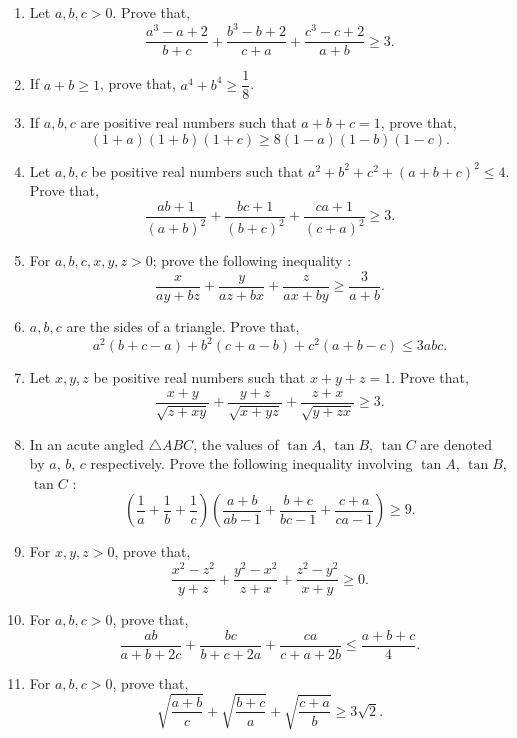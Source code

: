 \documentclass[11pt, a4paper]{article}
\begin{document}
\begin{enumerate}
	\item Let $a, b, c > 0$. Prove that, $$\dfrac{a^3 - a +2}{b+c} + \dfrac{b^3 - b +2}{c + a} + \dfrac{c^3 - c +2}{a + b} \geq 3.$$
	
	\item If $a+b \geq 1$, prove that, $a^4 + b^4 \geq \dfrac{1}{8}$.
	
	\item If $a, b, c$ are positive real numbers such that $a+b+c = 1$, prove that, $$(1+a)(1+b)(1+c) \geq 8 (1-a)(1-b)(1-c).$$
	
	\item Let $a, b, c$ be positive real numbers such that $a^2 + b^2 + c^2 + (a+b+c)^2 \leq 4$. Prove that, $$\dfrac{ab+1}{(a+b)^2} + \dfrac{bc+1}{(b+c)^2} + \dfrac{ca+1}{(c+a)^2} \geq 3.$$
	
	\item For $a, b, c, x, y, z > 0$; prove the following inequality :
	$$\dfrac{x}{ay+bz} + \dfrac{y}{az+bx} + \dfrac{z}{ax+by} \geq \dfrac{3}{a+b}.$$
	
	\item $a, b, c$ are the sides of a triangle. Prove that, $$a^2(b+c-a) + b^2(c+a-b) + c^2(a+b-c) \leq 3abc.$$
	
	\item Let $x, y, z$ be positive real numbers such that $x + y + z = 1$. Prove that, $$\dfrac{x+y}{\sqrt{z+xy}} + \dfrac{y+z}{\sqrt{x+yz}} + \dfrac{z+x}{\sqrt{y+zx}} \geq 3.$$
	
	\item In an acute angled $\bigtriangleup ABC$, the values of $\tan A$, $\tan B$, $\tan C$ are denoted by $a$, $b$, $c$ respectively. Prove the following inequality involving $\tan A$, $\tan B$, $\tan C$ :
	$$\left( \dfrac{1}{a} + \dfrac{1}{b} + \dfrac{1}{c} \right) \left( \dfrac{a+b}{ab-1} + \dfrac{b+c}{bc-1} + \dfrac{c+a}{ca-1} \right) \geq 9.$$
	
	\item For $x, y, z > 0$, prove that, $$\dfrac{x^2 - z^2}{y+z} + \dfrac{y^2 - x^2}{z+x} + \dfrac{z^2 - y^2}{x+y} \geq 0.$$
	
	\item For $a, b, c > 0$, prove that, $$\dfrac{ab}{a+b+2c} + \dfrac{bc}{b+c+2a} + \dfrac{ca}{c+a+2b} \leq \dfrac{a+b+c}{4}.$$
	
	\item For $a, b, c > 0$, prove that, $$\sqrt{\dfrac{a+b}{c}} + \sqrt{\dfrac{b+c}{a}} + \sqrt{\dfrac{c+a}{b}} \geq 3\sqrt{2}.$$
	

\end{enumerate}
\end{document}
